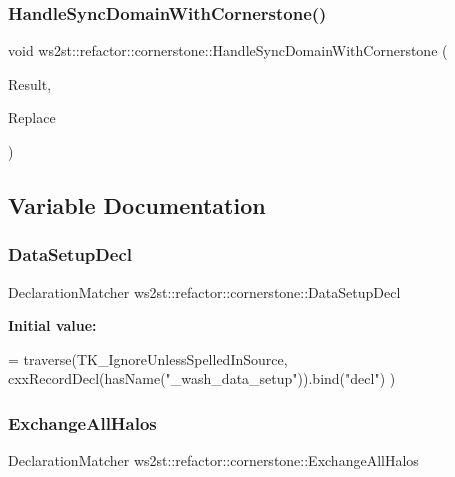 \subsubsection{\texorpdfstring{Handle\+Sync\+Domain\+With\+Cornerstone()}{HandleSyncDomainWithCornerstone()}}
{\footnotesize\ttfamily void ws2st\+::refactor\+::cornerstone\+::\+Handle\+Sync\+Domain\+With\+Cornerstone (\begin{DoxyParamCaption}\item[{const Match\+Finder\+::\+Match\+Result \&}]{Result,  }\item[{Replacements \&}]{Replace }\end{DoxyParamCaption})}



\subsection{Variable Documentation}
\mbox{\label{namespacews2st_1_1refactor_1_1cornerstone_a6d90cd2b9d249f6bbd6f33c942bd92f7}} 
\subsubsection{\texorpdfstring{Data\+Setup\+Decl}{DataSetupDecl}}
{\footnotesize\ttfamily Declaration\+Matcher ws2st\+::refactor\+::cornerstone\+::\+Data\+Setup\+Decl}

{\bfseries Initial value\+:}
\begin{DoxyCode}
= traverse(TK\_IgnoreUnlessSpelledInSource, 
                cxxRecordDecl(hasName(\textcolor{stringliteral}{"\_wash\_data\_setup"})).bind(\textcolor{stringliteral}{"decl"})
            )
\end{DoxyCode}
\mbox{\label{namespacews2st_1_1refactor_1_1cornerstone_a6270afd2be3fdcbea000ff4c5b151556}} 
\subsubsection{\texorpdfstring{Exchange\+All\+Halos}{ExchangeAllHalos}}
{\footnotesize\ttfamily Declaration\+Matcher ws2st\+::refactor\+::cornerstone\+::\+Exchange\+All\+Halos}

